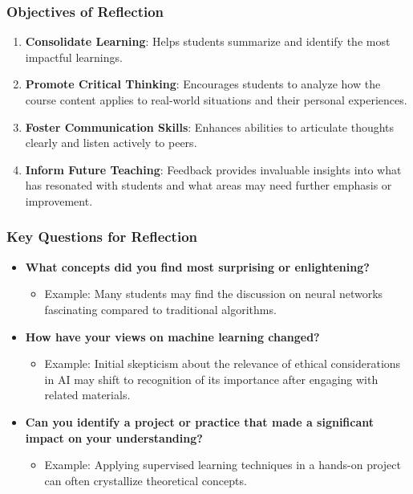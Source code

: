 \documentclass[aspectratio=169]{beamer}
\begin{document}
\begin{frame}[fragile]
    \frametitle{Objectives of Reflection}
    \begin{enumerate}
        \item \textbf{Consolidate Learning}: Helps students summarize and identify the most impactful learnings.
        \item \textbf{Promote Critical Thinking}: Encourages students to analyze how the course content applies to real-world situations and their personal experiences.
        \item \textbf{Foster Communication Skills}: Enhances abilities to articulate thoughts clearly and listen actively to peers.
        \item \textbf{Inform Future Teaching}: Feedback provides invaluable insights into what has resonated with students and what areas may need further emphasis or improvement.
    \end{enumerate}
\end{frame}

\begin{frame}[fragile]
    \frametitle{Key Questions for Reflection}
    \begin{itemize}
        \item \textbf{What concepts did you find most surprising or enlightening?}
            \begin{itemize}
                \item Example: Many students may find the discussion on neural networks fascinating compared to traditional algorithms.
            \end{itemize}
        \item \textbf{How have your views on machine learning changed?}
            \begin{itemize}
                \item Example: Initial skepticism about the relevance of ethical considerations in AI may shift to recognition of its importance after engaging with related materials.
            \end{itemize}
        \item \textbf{Can you identify a project or practice that made a significant impact on your understanding?}
            \begin{itemize}
                \item Example: Applying supervised learning techniques in a hands-on project can often crystallize theoretical concepts.
            \end{itemize}
    \end{itemize}
\end{frame}
\end{document}
